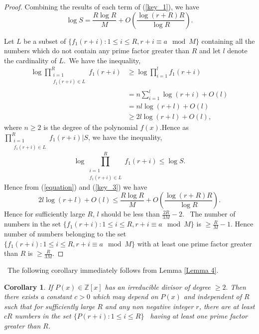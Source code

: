 \documentclass{amsart}
\newtheorem{Lemma 1}{Lemma}[section]
\newtheorem{Lemma 3}[Lemma 1]{Lemma}
\newtheorem{Lucas The}[Lemma 1]{Theorem}
\newtheorem{lem 1}[Lemma 1]{Lemma}
\newtheorem{Corollary}[Lemma 1]{Corollary}
\newtheorem{Corollary 1}[Lemma 1]{Corollary}
\newtheorem{Corollary 2}[Lemma 1]{Corollary}
\begin{document}
\begin{proof}
		Combining the results of each term of (\ref{key_1}), we have\begin{equation}\label{equation}\log S=\frac{R\log R}{M}+O\left(\frac{\log (r+R)R}{\log R}\right). \end{equation}
		
		Let $L$ be a subset of $\{f_1(r+i) : 1\leq i\leq R,r+i\equiv a \mod M\}$ containing all the numbers which do not contain any prime factor greater than $R$ and let $l$ denote the cardinality of $L$. We have the inequality,\begin{align}\log \prod_{\substack{i=1\\f_1(r+i)\in L}}^{R}f_1(r+i)&\geq \log \prod_{i=1}^{l}f_1(r+i)\\&=n\sum_{i=1}^{l}\log (r+i)+O(l)\\&=nl\log (r+l)+O(l)\\&\geq 2l\log (r+l)+O(l)\label{key_3},\end{align}where $n\geq 2$ is the degree of the polynomial $f(x)$.Hence as $\prod_{\substack{i=1\\f_1(r+i)\in L}}^{R}f_1(r+i)|S$, we have the inequality,
		\[\log \prod_{\substack{i=1\\f_1(r+i)\in L}}^{R}f_1(r+i)\leq \log S.\] Hence from (\ref{equation}) and (\ref{key_3}) we have\begin{equation*}2l\log (r+l)+O(l)\leq \frac{R\log R}{M}+O\left(\frac{\log (r+R)R}{\log R}\right).\end{equation*}Hence for sufficiently large $R$, $l$ should be less than $ \frac{2R}{3M}-2$.  The number of numbers in the set $\{f_1(r+i) : 1\leq i \leq R,r+i\equiv a \mod M\}$ is $\geq \frac{R}{M}-1$. Hence number of numbers belonging to the set $\{f_1(r+i) : 1\leq i \leq R,r+i\equiv a \mod M\}$ with at least one prime factor greater than $R$ is $\geq \frac{R}{3M}$.\end{proof} The following corollary immediately follows from Lemma \ref{Lemma 4}. \begin{Corollary}\label{Corollary}If $P(x)\in \mathbb{Z}[x]$ has an irreducible divisor of degree $\geq 2.$ Then there exists a constant $c>0$ which may depend on $P(x)$ and independent of $R$ such that for sufficiently large $R$ and any non negative integer $r$, there are at least $cR$ numbers in the set $\{P(r+i) : 1\leq i \leq R\}$  having at least one prime factor greater than $R$. \end{Corollary}
	
\end{document}
